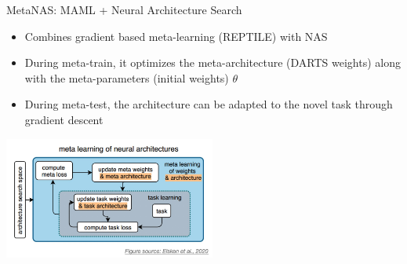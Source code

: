 \begin{frame}{MetaNAS: MAML + Neural Architecture Search}
    \begin{itemize}
        \item Combines gradient based meta-learning (REPTILE) with NAS
        \item During meta-train, it optimizes the meta-architecture (DARTS weights) along with the meta-parameters (initial weights) $\theta$
        \item During meta-test, the architecture can be adapted to the novel task through gradient descent
    \end{itemize}
    \centering\includegraphics[height=4cm]{image/img235920.jpg}
\end{frame}

